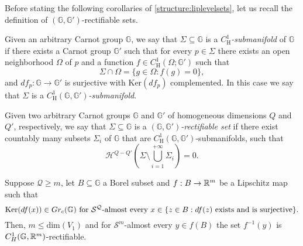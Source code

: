 \documentclass[10pt, a4paper,
oneside, headinclude,footinclude]{scrartcl}
\begin{document}
Before stating the following corollaries of \cref{structure:liplevelsets}, let us recall the definition of $(\mathbb G,\mathbb G')$-rectifiable sets.
\begin{definizione}\label{def:C1Hmanifold}
Given an arbitrary Carnot group $\mathbb G$, we say that $\Sigma\subseteq \mathbb G$ is a {\em $C^1_{\mathrm H}$-submanifold} of $\mathbb G$ if there exists a Carnot group $\mathbb G'$ such that for every $p\in \Sigma$ there exists an open neighborhood $\Omega$ of $p$ and a function $f\in C^1_{\mathrm H}(\Omega;\mathbb G')$ such that 
\begin{equation}\label{eqn:RepresentationOfSigma}
\Sigma\cap \Omega =\{g\in\Omega:f(g)=0\},
\end{equation}
and $df_p:\mathbb G\to\mathbb G'$ is surjective with $\mathrm{Ker}(df_p)$ complemented. In this case we say that $\Sigma$ is a {\em $C^1_{\mathrm H}(\mathbb G,\mathbb G')$-submanifold}.
\end{definizione}
\begin{definizione}\label{def:GG'Rect}
Given two arbitrary Carnot groups $\mathbb G$ and $\mathbb G'$ of homogeneous dimensions $Q$ and $Q'$, respectively, we say that $\Sigma\subseteq \mathbb G$ is a {\em $(\mathbb G,\mathbb G')$-rectifiable set} if there exist countably many subsets $\Sigma_i$ of $\mathbb G$ that are $C^1_{\mathrm H}(\mathbb G,\mathbb G')$-submanifolds, such that 
$$
\mathcal{H}^{Q-Q'}\left(\Sigma\setminus\bigcup_{i=1}^{+\infty}\Sigma_i\right)=0.
$$
\end{definizione}

\begin{corollario}\label{structure:liplevelsets2}
Suppose $\mathcal{Q}\geq m$, let $B\subseteq \mathbb G$ a Borel subset and $f:B\to \mathbb{R}^m$ be a Lipschitz map such that
\begin{equation}
    \text{$\mathrm{Ker}(df(x))\in Gr_c(\mathbb{G})$ for $\mathcal{S}^{\mathcal{Q}}$-almost every $x\in \{z\in B:df(z) \text{ exists and is surjective}\}$.}
    \label{condizionesurjeu}
\end{equation}
Then, $m\leq \mathrm{dim}(V_1)$ and for $\mathcal{S}^m$-almost every $y\in f(B)$ the set $f^{-1}(y)$ is $C^1_H(\mathbb{G},\mathbb{R}^m)$-rectifiable.
\end{corollario}
\end{document}
